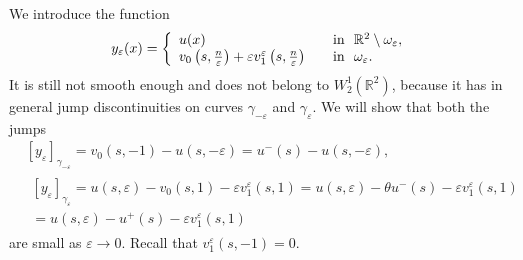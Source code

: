 \documentclass[reqno]{amsart}
\theoremstyle{plain}
\numberwithin{equation}{section}
\renewcommand{\kappa}{\varkappa}
\newcommand{\Real}{\mathbb R}
\newcommand{\eps}{\varepsilon}
\renewcommand{\leq}{\leqslant}
\newcommand\nep{\textstyle\frac n\eps}
\begin{document}
%


We introduce the function
\begin{equation}\label{ApproxWe}
y_\eps(x)=
\left\{
  \begin{array}{ll}
    u(x)&\quad \hbox{in \ }\Real^2\setminus \omega_\eps, \\
    v_0\left(s,\nep\right)+\eps v_1^\eps\left(s,\nep\right)
&\quad \hbox{in \ } \omega_\eps.
  \end{array}
\right.
\end{equation}
It is still not smooth enough and does not belong to $W_2^1(\Real^2)$, because it has  in general  jump discontinuities on curves  $\gamma_{-\eps}$ and $\gamma_\eps$.
We will show  that both the jumps
\begin{align*}
&[y_\eps]_{\gamma_{-\eps}}=v_0(s,-1)-u(s,-\eps)=u^-(s)-u(s,-\eps),\\
&\begin{aligned}{}
[y_\eps]_{\gamma_{\eps}}=u(s,\eps)-v_0(s,1)-\eps v_1^\eps(s,1)=u(s,\eps)-\theta u^-(s)-\eps v_1^\eps(s,1)\\
=
u(s,\eps)- u^+(s)-\eps v_1^\eps(s,1)
\end{aligned}
\end{align*}
are small as $\eps\to 0$.
Recall that $v_1^\eps(s,-1)=0$.
\end{document}
